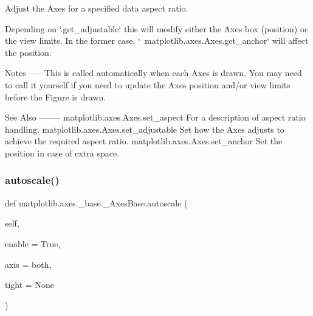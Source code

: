 \begin{DoxyVerb}Adjust the Axes for a specified data aspect ratio.

Depending on `.get_adjustable` this will modify either the
Axes box (position) or the view limits. In the former case,
`~matplotlib.axes.Axes.get_anchor` will affect the position.

Notes
-----
This is called automatically when each Axes is drawn.  You may need
to call it yourself if you need to update the Axes position and/or
view limits before the Figure is drawn.

See Also
--------
matplotlib.axes.Axes.set_aspect
    For a description of aspect ratio handling.
matplotlib.axes.Axes.set_adjustable
    Set how the Axes adjusts to achieve the required aspect ratio.
matplotlib.axes.Axes.set_anchor
    Set the position in case of extra space.
\end{DoxyVerb}
 \mbox{\label{classmatplotlib_1_1axes_1_1__base_1_1__AxesBase_a2027efcd4dfcbd74407ab0fa7dacc223}} 
\subsubsection{\texorpdfstring{autoscale()}{autoscale()}}
{\footnotesize\ttfamily def matplotlib.\+axes.\+\_\+base.\+\_\+\+Axes\+Base.\+autoscale (\begin{DoxyParamCaption}\item[{}]{self,  }\item[{}]{enable = {\ttfamily True},  }\item[{}]{axis = {\ttfamily \textquotesingle{}both\textquotesingle{}},  }\item[{}]{tight = {\ttfamily None} }\end{DoxyParamCaption})}

